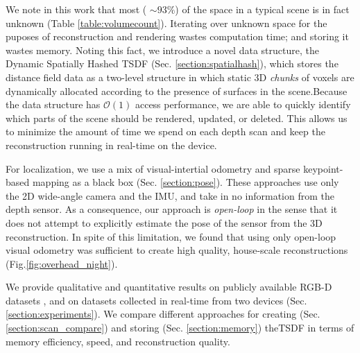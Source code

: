 \documentclass[10pt,twocolumn,letterpaper]{article}
\newcommand{\figref}[1]{Fig.\ref{#1}}
\begin{document}
We note in this work that most ( $\sim 93\%$) of the space in a typical scene
is in fact unknown (Table \ref{table:volumecount}). Iterating over unknown space for the
puposes of reconstruction and rendering wastes computation time; and storing it
wastes memory. Noting this fact, we introduce a novel data structure, the
Dynamic Spatially Hashed \cite{SpatialHashing} TSDF (Sec. \ref{section:spatialhash}),
which stores the distance field data as a two-level structure in which static
3D \textit{chunks} of voxels are dynamically allocated according to the
presence of surfaces in the scene.Because the data structure has
$\mathcal{O}(1)$ access performance, we are able to quickly identify which
parts of the scene should be rendered, updated, or deleted. This allows us to
minimize the amount of time we spend on each depth scan and keep the
reconstruction running in real-time on the device.

For localization, we use a mix of  visual-intertial odometry \cite{VINS} and
sparse keypoint-based mapping \cite{FastSlam} as a black box (Sec.
\ref{section:pose}). These approaches use only the 2D wide-angle camera and the
IMU, and take in no information from the depth sensor. As a consequence, our
approach is \textit{open-loop} in the sense that it does not attempt to explicitly estimate the pose of the sensor
from the 3D reconstruction. In spite of this limitation, we found that
using only open-loop visual odometry was sufficient to create high quality,
house-scale reconstructions (\figref{fig:overhead_night}).

 We provide qualitative and  quantitative results on publicly available RGB-D
 datasets \cite{FREIBURG}, and on datasets collected in real-time from two
 devices (Sec. \ref{section:experiments}). We compare different approaches for
 creating (Sec. \ref{section:scan_compare}) and storing (Sec.
 \ref{section:memory}) theTSDF in terms of memory efficiency, speed, and
 reconstruction quality.
\end{document}
